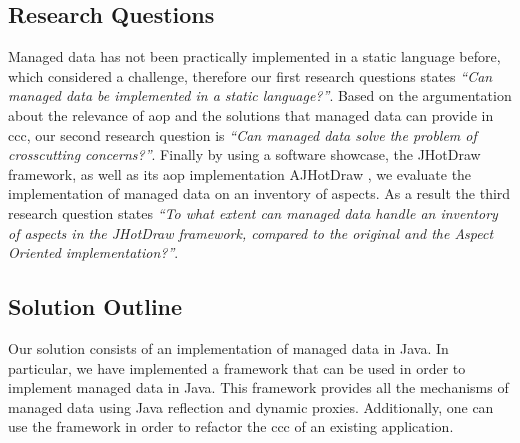 \subsection{Research Questions}\label{Research Questions}
Managed data has not been practically implemented in a static language before, which considered a challenge, therefore our first research questions states 
\textit{``Can managed data be implemented in a static language?''}.
Based on the argumentation about the relevance of \ac{aop} and the solutions that managed data can provide in \acrlong{ccc}, our second research question is \textit{``Can managed data solve the problem of crosscutting concerns?''}. 
Finally by using a software showcase, the JHotDraw framework, as well as its \ac{aop} implementation AJHotDraw \cite{marinajhotdraw}, 
we evaluate the implementation of managed data on an inventory of aspects. 
As a result the third research question states \textit{``To what extent can managed data handle an inventory of aspects in the JHotDraw framework, compared to the original and the Aspect Oriented implementation?''}.

\subsection{Solution Outline}\label{Solution Outline}
Our solution consists of an implementation of managed data in Java.
In particular, we have implemented a framework that can be used in order to implement managed data in Java.
This framework provides all the mechanisms of managed data using Java reflection and dynamic proxies. Additionally, one can use the framework in order to refactor the \ac{ccc} of an existing application.

